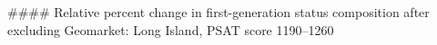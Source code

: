 #### Relative percent change in first-generation status composition after excluding Geomarket: Long Island, PSAT score 1190–1260
